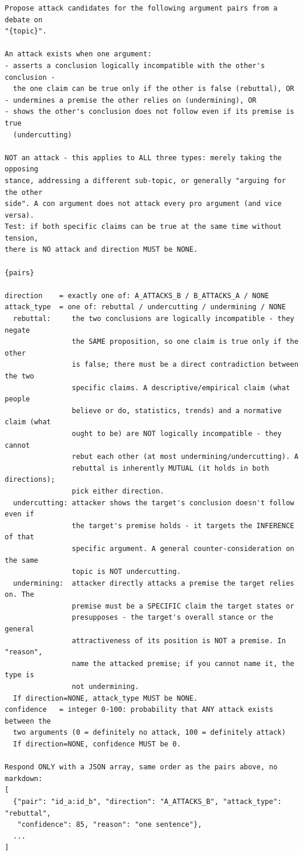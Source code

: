 \begin{lstlisting}[breaklines=true, basicstyle=\ttfamily\footnotesize]
Propose attack candidates for the following argument pairs from a debate on
"{topic}".

An attack exists when one argument:
- asserts a conclusion logically incompatible with the other's conclusion -
  the one claim can be true only if the other is false (rebuttal), OR
- undermines a premise the other relies on (undermining), OR
- shows the other's conclusion does not follow even if its premise is true
  (undercutting)

NOT an attack - this applies to ALL three types: merely taking the opposing
stance, addressing a different sub-topic, or generally "arguing for the other
side". A con argument does not attack every pro argument (and vice versa).
Test: if both specific claims can be true at the same time without tension,
there is NO attack and direction MUST be NONE.

{pairs}

direction    = exactly one of: A_ATTACKS_B / B_ATTACKS_A / NONE
attack_type  = one of: rebuttal / undercutting / undermining / NONE
  rebuttal:     the two conclusions are logically incompatible - they negate
                the SAME proposition, so one claim is true only if the other
                is false; there must be a direct contradiction between the two
                specific claims. A descriptive/empirical claim (what people
                believe or do, statistics, trends) and a normative claim (what
                ought to be) are NOT logically incompatible - they cannot
                rebut each other (at most undermining/undercutting). A
                rebuttal is inherently MUTUAL (it holds in both directions);
                pick either direction.
  undercutting: attacker shows the target's conclusion doesn't follow even if
                the target's premise holds - it targets the INFERENCE of that
                specific argument. A general counter-consideration on the same
                topic is NOT undercutting.
  undermining:  attacker directly attacks a premise the target relies on. The
                premise must be a SPECIFIC claim the target states or
                presupposes - the target's overall stance or the general
                attractiveness of its position is NOT a premise. In "reason",
                name the attacked premise; if you cannot name it, the type is
                not undermining.
  If direction=NONE, attack_type MUST be NONE.
confidence   = integer 0-100: probability that ANY attack exists between the
  two arguments (0 = definitely no attack, 100 = definitely attack)
  If direction=NONE, confidence MUST be 0.

Respond ONLY with a JSON array, same order as the pairs above, no markdown:
[
  {"pair": "id_a:id_b", "direction": "A_ATTACKS_B", "attack_type": "rebuttal",
   "confidence": 85, "reason": "one sentence"},
  ...
]
\end{lstlisting}

